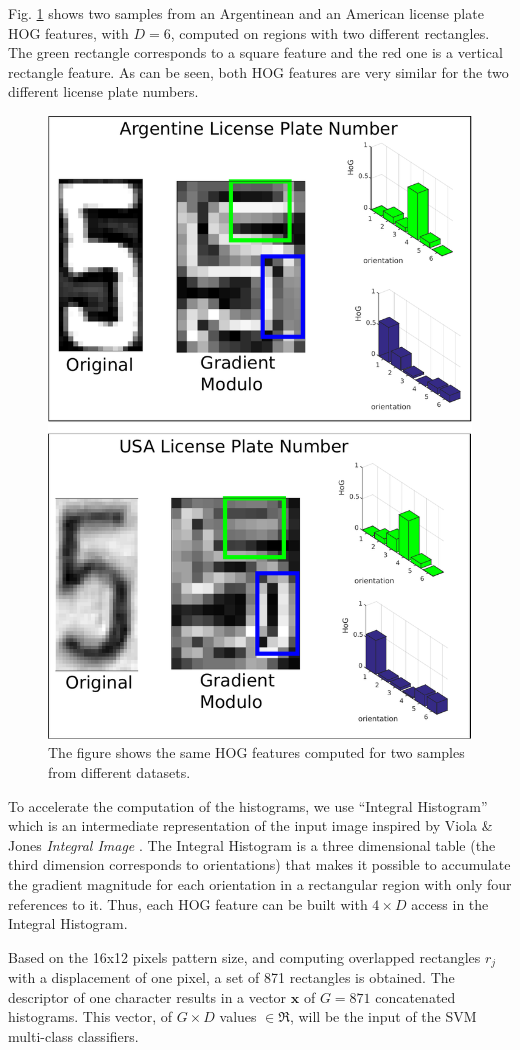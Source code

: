\documentclass{ipol}
\def\x{{\mathbf x}}
\begin{document}
Fig. \ref{fig:HoG} shows two samples from an Argentinean and an American license plate HOG features, with $D=6$, computed on regions with two different rectangles.
The green rectangle corresponds to a square feature and the red one is a vertical rectangle feature.
As can be seen, both HOG features are very similar for the two different license plate numbers.

\begin{figure}[!htbp]
\begin{center}
\includegraphics[width=.6\linewidth]{HoG.pdf}
\caption{The figure shows the same HOG features computed for two samples from different datasets.}
\label{fig:HoG}
\end{center}
\end{figure}

To accelerate the computation of the histograms, we use ``Integral Histogram'' \cite{Porikli:2005} which is an intermediate representation of the input image inspired by Viola \& Jones \textit{Integral Image} \cite{Viola:2004}. 
The Integral Histogram is a three dimensional table (the third dimension corresponds to orientations) that makes it possible to accumulate the gradient magnitude for each orientation in a rectangular region with only four references to it. 
Thus, each HOG feature can be built with $4 \times D$ access in the Integral Histogram.

Based on the 16x12 pixels pattern size, and computing overlapped rectangles $r_j$ with a displacement of one pixel, a set of 871 rectangles is obtained.
The descriptor of one character results in a vector $\x$ of $G=871$ concatenated histograms. 
This vector, of $G \times D$ values $\in \Re$, will be the input of the SVM multi-class classifiers.
\end{document}
